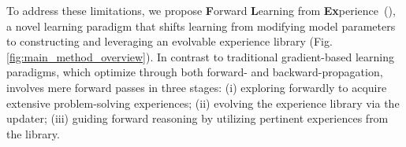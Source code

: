 To address these limitations, we propose \textbf{F}orward \textbf{L}earning from \textbf{Ex}perience~(\textbf{\method{}}), a novel learning paradigm that shifts learning from modifying model parameters to constructing and leveraging an evolvable experience library (Fig.\ref{fig:main_method_overview}).
In contrast to traditional gradient-based learning paradigms, which optimize through both forward- and backward-propagation, \method{} involves mere forward passes in three stages: 
(i) exploring forwardly to acquire extensive problem-solving experiences; %
(ii) evolving the experience library via the updater;
(iii) guiding forward reasoning by utilizing pertinent experiences from the library.

